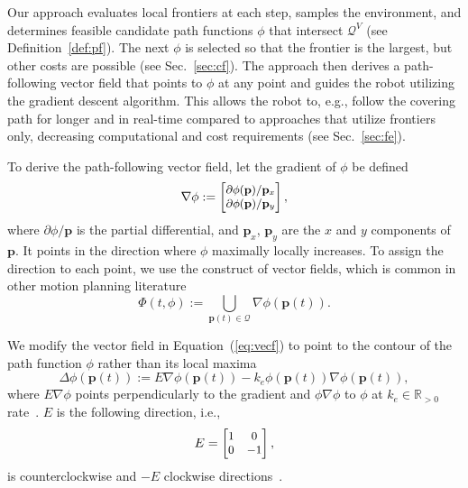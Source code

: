\documentclass[letterpaper,10pt,conference,twoside]{IEEEtran}
\theoremstyle{definition}
\begin{document}
Our 
approach evaluates local frontiers at each step, samples the environment, and determines feasible candidate path functions $\phi$ that intersect $\mathcal{Q}^V$ (see Definition~\ref{def:pf}).
The next $\phi$ is selected so that the frontier is the largest, but other costs are possible (see Sec.~\ref{sec:cf}). 
The %
approach then derives a path-following vector field that points to $\phi$ at any point and guides the robot utilizing the gradient descent algorithm. This allows the robot to, e.g., follow the covering path for longer and in real-time compared to approaches that utilize frontiers only, decreasing computational and cost requirements (see Sec.~\ref{sec:fe}).

To derive the path-following vector field, let the gradient of $\phi$ be defined
\begin{equation}\small
  \nabla\phi:=\begin{bmatrix}
    \partial\phi(\mathbf{p})/\mathbf{p}_x\\
    \partial\phi(\mathbf{p})/\mathbf{p}_y
  \end{bmatrix},
\end{equation}
where $\partial\phi/\mathbf{p}$ is the partial differential, and $\mathbf{p}_x$, $\mathbf{p}_y$ are the $x$ and $y$ components of $\mathbf{p}$.
It points in the direction where $\phi$ maximally locally increases. To assign the direction to each point, we use the construct of vector fields, which is common in other motion planning literature~\cite{%
garcia2017guidance,goncalves2010vector}
\begin{equation}\label{eq:vecf}
  \Phi(t,\phi):={\textstyle \bigcup\limits_{\mathbf{p}(t)\in\mathcal{Q}}}\nabla\phi(\mathbf{p}(t)).
\end{equation}

We modify the vector field in Equation~(\ref{eq:vecf}) to point to the contour of the path function $\phi$ rather than its local maxima
\begin{equation}\label{eq:pfvf}
  \Delta\phi(\mathbf{p}(t)):=E\nabla\phi(\mathbf{p}(t))-k_e\phi(\mathbf{p}(t))\nabla\phi(\mathbf{p}(t)),
\end{equation}
where $E\nabla\phi$ points perpendicularly to the gradient and $\phi\nabla\phi$ to $\phi$ at $k_e\in\mathbb{R}_{>0}$ rate~\cite{garcia2017guidance}. $E$ is the following direction, i.e.,
\begin{equation}\small
  E=\begin{bmatrix}
    1 & 0\\ 0 & -1
  \end{bmatrix},
\end{equation}
is counterclockwise and $-E$ clockwise directions~\cite{seewaldphdthesis}.
\end{document}
